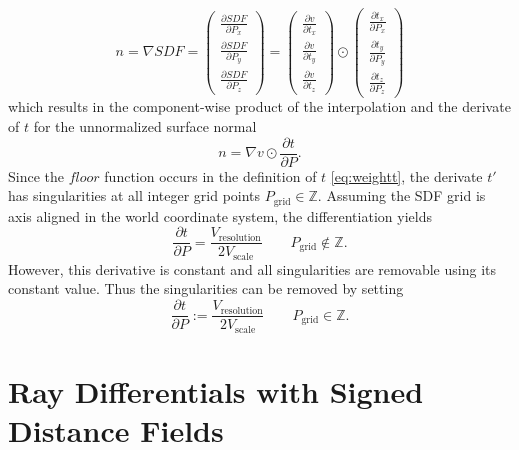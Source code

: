 \documentclass[12pt]{article}
\newcommand{\pardiff}[2]{\frac{\partial #1}{\partial #2} }
\newcommand{\newlinell}{\\[0.6em]}
\begin{document}
\begin{equation}
n = \nabla SDF = 
\begin{pmatrix}
\pardiff{SDF}{P_x} \newlinell
\pardiff{SDF}{P_y} \newlinell
\pardiff{SDF}{P_z}
\end{pmatrix}
=
\begin{pmatrix}
\pardiff{v}{t_x} \newlinell
\pardiff{v}{t_y} \newlinell
\pardiff{v}{t_z}
\end{pmatrix}
\odot
\begin{pmatrix}
\pardiff{t_x}{P_x} \newlinell
\pardiff{t_y}{P_y} \newlinell
\pardiff{t_z}{P_z}
\end{pmatrix} 
\end{equation}
which results in the component-wise product of the interpolation and the derivate of $t$ for the unnormalized surface normal
\begin{equation} \label{eq:normaldiscrete}
n = \nabla v \odot \pardiff{t}{P}
.\end{equation}
Since the $floor$ function occurs in the definition of $t$ \eqref{eq:weightt}, the derivate $t'$ has singularities at all integer grid points $P_{\text{grid}} \in \mathbb{Z}$. Assuming the SDF grid is axis aligned in the world coordinate system, the differentiation yields
\begin{equation}
\pardiff{t}{P} = \frac{V_{\text{resolution}}}{2V_{\text{scale}}}
\qquad
P_{\text{grid}} \notin \mathbb{Z}
.\end{equation}
However, this derivative is constant and all singularities are removable using its constant value. Thus the singularities can be removed by setting
\begin{equation}
\pardiff{t}{P} := \frac{V_{\text{resolution}}}{2V_{\text{scale}}}
\qquad
P_{\text{grid}} \in \mathbb{Z}
.\end{equation}

\section{Ray Differentials with Signed Distance Fields}
\end{document}
